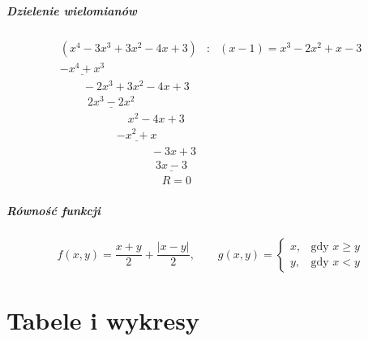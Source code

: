 \documentclass[oneside, fleqn]{book}
\begin{document}
\paragraph{Dzielenie wielomianów}
\begin{displaymath}
\begin{array}{lll}
(x^4 - 3x^3 + 3x^2 -4x + 3) & : & (x-1)  =  x^3 - 2x^2 + x -3 \\
\underline{-x^4 + x^3} & &  \\
\qquad -2x^3 + 3x^2 -4x +3 & & \\
\qquad \ \ \underline{2x^3 - 2x^2} & &\\
\qquad \qquad \qquad x^2 - 4x + 3 & & \\
\qquad \qquad \quad \underline{-x^2 + x}  & & \\
\qquad \qquad \qquad \qquad -3x + 3 & & \\
\qquad \qquad \qquad \qquad \ \ \underline{3x - 3} & & \\
\qquad \qquad \qquad \qquad \quad R = 0 & &
\end{array}
\end{displaymath}

\paragraph{Równość funkcji}
\begin{displaymath}
f(x,y) = \frac{x+y}{2} + \frac{|x-y|}{2}, \qquad g(x,y) = \begin{cases} x, &\textrm{gdy } x \ge y\\y, &\textrm{gdy } x < y \end{cases}
\end{displaymath}
\chapter{Tabele i wykresy}
\end{document}
